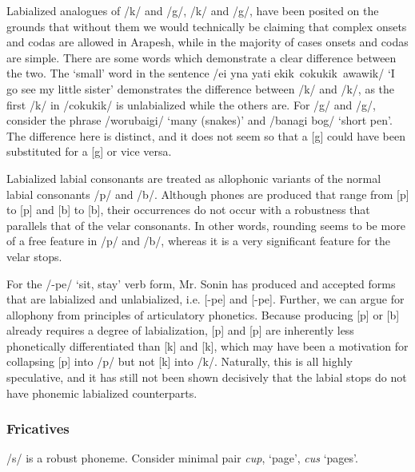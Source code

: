 \documentclass[pdftex,12pt,letterpaper]{article}
\let\ipa\textipa
\def\sw{\ipa{\super w}}
\begin{document}
 Labialized analogues of /k/ and /g/, /k\sw/ and /g\sw/, have been posited on the grounds that without them we would technically be claiming that complex onsets and codas are allowed in Arapesh, while in the majority of cases onsets and codas are simple. There are some words which demonstrate a clear difference between the two. The `small' word in the sentence /ei y\ipa{@}na yati ekik\sw\, cokuk\sw ik\sw\,  awawik\sw/ `I go see my little sister' demonstrates the difference between /k/ and /k\sw/, as the first /k/ in /cokuk\sw ik\sw/ is unlabialized while the others are. For /g/ and /g\sw/, consider the phrase /worubaig\sw i/ `many (snakes)' and /banagi bog/ `short pen'. The difference here is distinct, and it does not seem so that a [g\sw] could have been substituted for a [g] or vice versa.
 
 Labialized labial consonants are treated as allophonic variants of the normal labial consonants /p/ and /b/. Although phones are produced that range from [p] to [p\sw] and [b] to [b\sw], their occurrences do not occur with a robustness that parallels that of the velar consonants. In other words, rounding seems to be more of a free feature in /p/ and /b/, whereas it is a very significant feature for the velar stops. 
 
 For the /-pe/ `sit, stay' verb form, Mr. Sonin has produced and accepted forms that are labialized and unlabialized, i.e. [-pe] and [-p\sw e]. Further, we can argue for allophony from principles of articulatory phonetics. Because producing [p] or [b] already requires a degree of labialization, [p] and [p\sw] are inherently less phonetically differentiated than [k] and [k\sw], which may have been a motivation for collapsing [p\sw] into /p/ but not [k\sw] into /k/. Naturally, this is all highly speculative, and it has still not been shown decisively that the labial stops do not have phonemic labialized counterparts.

 \subsubsection{Fricatives}

 /s/ is a robust phoneme. Consider minimal pair \emph{cup}, `page', \emph{cus} `pages'. 
\end{document}
